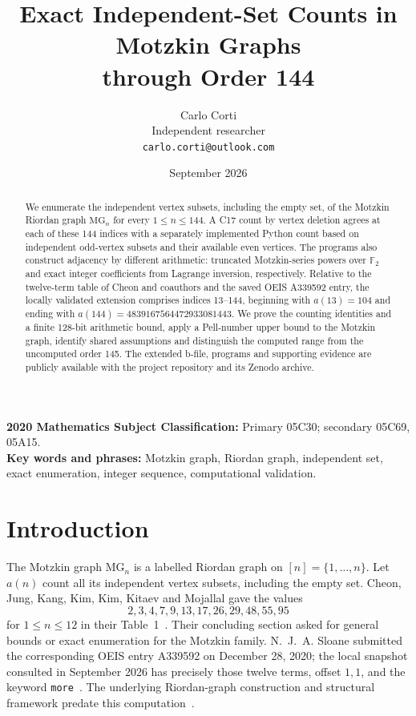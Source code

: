 \documentclass[11pt,a4paper]{article}
\title{Exact Independent-Set Counts in Motzkin Graphs\\through Order 144}
\author{Carlo Corti\\Independent researcher\\\texttt{carlo.corti@outlook.com}}
\date{September 2026}
\newcommand{\MG}{\mathrm{MG}}
\begin{document}
\maketitle

\begin{abstract}
We enumerate the independent vertex subsets, including the empty set, of the
Motzkin Riordan graph $\MG_n$ for every $1\leq n\leq144$.  A C17 count by
vertex deletion agrees at each of these 144 indices with a separately
implemented Python count based on independent odd-vertex subsets and their
available even vertices.  The programs also construct adjacency by different
arithmetic: truncated Motzkin-series powers over $\mathbb F_2$ and exact
integer coefficients from Lagrange inversion, respectively.  Relative to
the twelve-term table of Cheon and coauthors and the saved OEIS A339592
entry, the locally validated extension comprises indices 13--144, beginning
with $a(13)=104$ and ending with
$a(144)=4839167564472933081443$.  We prove the counting identities and a
finite 128-bit arithmetic bound, apply a Pell-number upper bound to the
Motzkin graph, identify shared assumptions and distinguish
the computed range from the uncomputed order 145.  The extended b-file,
programs and supporting evidence are publicly available with the project
repository and its Zenodo archive.
\end{abstract}
\noindent\textbf{2020 Mathematics Subject Classification:} Primary 05C30;
secondary 05C69, 05A15.\\
\textbf{Key words and phrases:} Motzkin graph, Riordan graph, independent set,
exact enumeration, integer sequence, computational validation.

\section{Introduction}\label{sec:intro}
The Motzkin graph $\MG_n$ is a labelled Riordan graph on $[n]=\{1,\ldots,n\}$.
Let $a(n)$ count all its independent vertex subsets, including the empty set.
Cheon, Jung, Kang, Kim, Kim, Kitaev and Mojallal gave the values
\[
2,3,4,7,9,13,17,26,29,48,55,95
\]
for $1\leq n\leq12$ in their Table~1~\cite{counting}.  Their concluding
section asked for general bounds or exact enumeration for the Motzkin
family.  N.~J.~A. Sloane
submitted the corresponding OEIS entry A339592 on December 28, 2020; the
local snapshot consulted in September 2026 has precisely those twelve terms,
offset $1,1$, and the keyword
\texttt{more}~\cite{oeis}.  The underlying Riordan-graph construction and
structural framework predate this computation~\cite{structure}.
\end{document}
